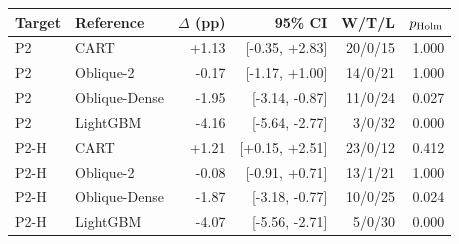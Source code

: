 \begin{tabular}{llrrrr}
\toprule
Target & Reference & $\Delta$ (pp) & 95\% CI & W/T/L & $p_{\rm Holm}$ \\
\midrule
P2 & CART & +1.13 & [-0.35, +2.83] & 20/0/15 & 1.000 \\
P2 & Oblique-2 & -0.17 & [-1.17, +1.00] & 14/0/21 & 1.000 \\
P2 & Oblique-Dense & -1.95 & [-3.14, -0.87] & 11/0/24 & 0.027 \\
P2 & LightGBM & -4.16 & [-5.64, -2.77] & 3/0/32 & 0.000 \\
P2-H & CART & +1.21 & [+0.15, +2.51] & 23/0/12 & 0.412 \\
P2-H & Oblique-2 & -0.08 & [-0.91, +0.71] & 13/1/21 & 1.000 \\
P2-H & Oblique-Dense & -1.87 & [-3.18, -0.77] & 10/0/25 & 0.024 \\
P2-H & LightGBM & -4.07 & [-5.56, -2.71] & 5/0/30 & 0.000 \\
\bottomrule
\end{tabular}
